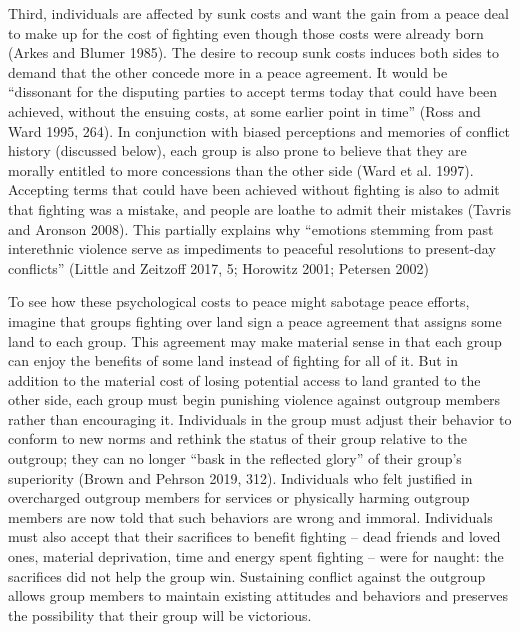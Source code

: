 \documentclass[11pt]{article}
\begin{document}
Third, individuals are affected by sunk costs and want the gain from a
peace deal to make up for the cost of fighting even though those costs
were already born (Arkes and Blumer 1985). The desire to recoup sunk
costs induces both sides to demand that the other concede more in a
peace agreement. It would be ``dissonant for the disputing parties to
accept terms today that could have been achieved, without the ensuing
costs, at some earlier point in time'' (Ross and Ward 1995, 264). In
conjunction with biased perceptions and memories of conflict history
(discussed below), each group is also prone to believe that they are
morally entitled to more concessions than the other side (Ward et al.
1997). Accepting terms that could have been achieved without fighting is
also to admit that fighting was a mistake, and people are loathe to
admit their mistakes (Tavris and Aronson 2008). This partially explains
why ``emotions stemming from past interethnic violence serve as
impediments to peaceful resolutions to present-day conflicts'' (Little
and Zeitzoff 2017, 5; Horowitz 2001; Petersen 2002)

To see how these psychological costs to peace might sabotage peace
efforts, imagine that groups fighting over land sign a peace agreement
that assigns some land to each group. This agreement may make material
sense in that each group can enjoy the benefits of some land instead of
fighting for all of it. But in addition to the material cost of losing
potential access to land granted to the other side, each group must
begin punishing violence against outgroup members rather than
encouraging it. Individuals in the group must adjust their behavior to
conform to new norms and rethink the status of their group relative to
the outgroup; they can no longer ``bask in the reflected glory'' of
their group's superiority (Brown and Pehrson 2019, 312). Individuals who
felt justified in overcharged outgroup members for services or
physically harming outgroup members are now told that such behaviors are
wrong and immoral. Individuals must also accept that their sacrifices to
benefit fighting -- dead friends and loved ones, material deprivation,
time and energy spent fighting -- were for naught: the sacrifices did
not help the group win. Sustaining conflict against the outgroup allows
group members to maintain existing attitudes and behaviors and preserves
the possibility that their group will be victorious.
\end{document}
